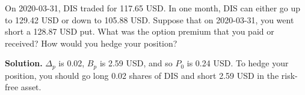 \noindent On 2020-03-31, DIS traded for 117.65 USD. In one month, DIS can either go up to 129.42 USD or down to 105.88 USD. Suppose that on 2020-03-31, you went short a 128.87 USD put. What was the option premium that you paid or received? How would you hedge your position?

\vspace{9pt}

\noindent\textbf{Solution.} $\Delta_{p}$ is 0.02, $B_{p}$ is 2.59 USD, and so $P_{0}$ is 0.24 USD. To hedge your position, you should go long 0.02 shares of DIS and short 2.59 USD in the risk-free asset.